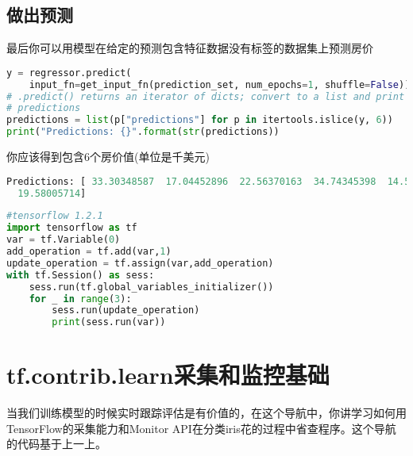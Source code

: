 \subsection{做出预测}
最后你可以用模型在给定的预测包含特征数据没有标签的数据集上预测房价
\begin{lstlisting}[language=Python]
y = regressor.predict(
    input_fn=get_input_fn(prediction_set, num_epochs=1, shuffle=False))
# .predict() returns an iterator of dicts; convert to a list and print
# predictions
predictions = list(p["predictions"] for p in itertools.islice(y, 6))
print("Predictions: {}".format(str(predictions))
\end{lstlisting}
你应该得到包含6个房价值(单位是千美元)
\begin{lstlisting}[language=Python]
Predictions: [ 33.30348587  17.04452896  22.56370163  34.74345398  14.55953979
  19.58005714]
\end{lstlisting}
\begin{lstlisting}[language=Python]
#tensorflow 1.2.1
import tensorflow as tf
var = tf.Variable(0)
add_operation = tf.add(var,1)
update_operation = tf.assign(var,add_operation)
with tf.Session() as sess:
    sess.run(tf.global_variables_initializer())
    for _ in range(3):
        sess.run(update_operation)
        print(sess.run(var))
\end{lstlisting}
\section{tf.contrib.learn采集和监控基础}
当我们训练模型的时候实时跟踪评估是有价值的，在这个导航中，你讲学习如何用TensorFlow的采集能力和Monitor API在分类iris花的过程中省查程序。这个导航的代码基于上一上。
